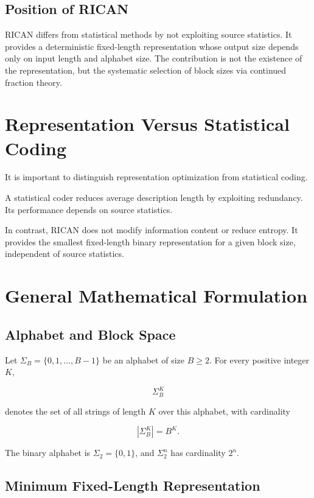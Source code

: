 \documentclass[10pt, conference]{IEEEtran}
\begin{document}
\subsection{Position of RICAN}

RICAN differs from statistical methods by not exploiting source statistics. It provides a deterministic fixed-length representation whose output size depends only on input length and alphabet size. The contribution is not the existence of the representation, but the systematic selection of block sizes via continued fraction theory.

\section{Representation Versus Statistical Coding}

It is important to distinguish representation optimization from statistical coding.

A statistical coder reduces average description length by exploiting redundancy. Its performance depends on source statistics.

In contrast, RICAN does not modify information content or reduce entropy. It provides the smallest fixed-length binary representation for a given block size, independent of source statistics.

\section{General Mathematical Formulation}

\subsection{Alphabet and Block Space}

Let $\Sigma_B = \{0,1,\ldots,B-1\}$ be an alphabet of size $B \ge 2$. For every positive integer $K$,

\[
\Sigma_B^{K}
\]

denotes the set of all strings of length $K$ over this alphabet, with cardinality

\[
|\Sigma_B^{K}|=B^K.
\]

The binary alphabet is $\Sigma_2=\{0,1\}$, and $\Sigma_2^n$ has cardinality $2^n$.

\subsection{Minimum Fixed-Length Representation}
\end{document}

